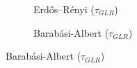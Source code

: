 
\begin{figure}%
    \centering
    \begin{subfigure}{0.3\columnwidth}
    \caption{Erdős–Rényi ($\tau_{GLR}$)}
    \label{tau_GLR_er}
    \end{subfigure}
    \hfill
    \begin{subfigure}{0.3\columnwidth}
    \caption{Barabási-Albert ($\tau_{GLR}$)}%
    \label{tau_GLR_BA}%
    \end{subfigure}

\end{figure}
